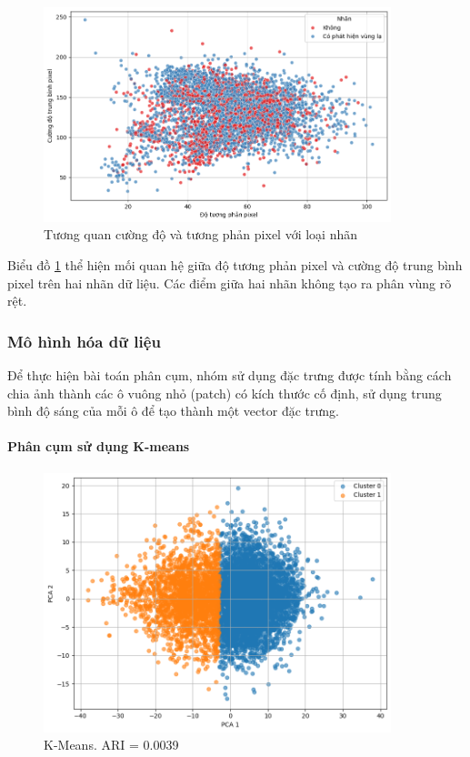     \begin{figure}[htp]
        \centering
        \includegraphics[width=0.90\textwidth]{images/Img_lung_intensity_contrast.png}
        \caption{Tương quan cường độ và tương phản pixel với loại nhãn}
        \label{fig:Img_lung_intensity_contrast}
    \end{figure}
    \FloatBarrier

    Biểu đồ \ref{fig:Img_lung_intensity_contrast} thể hiện mối quan hệ giữa độ tương phản pixel và cường độ trung bình pixel trên hai nhãn dữ liệu. Các điểm giữa hai nhãn không tạo ra phân vùng rõ rệt. 

\subsubsection{Mô hình hóa dữ liệu}
    Để thực hiện bài toán phân cụm, nhóm sử dụng đặc trưng được tính bằng cách chia ảnh thành các ô vuông nhỏ (patch) có kích thước cố định, sử dụng trung bình độ sáng của mỗi ô để tạo thành một vector đặc trưng.

    \paragraph{Phân cụm sử dụng K-means}
    \leavevmode

    \begin{figure}[htp]
        \centering
        \includegraphics[width=0.90\textwidth]{images/Img_lung_kmeans.png}
        \caption{K-Means. ARI = 0.0039}
        \label{fig:Img_lung_kmeans}
    \end{figure}
    \FloatBarrier

